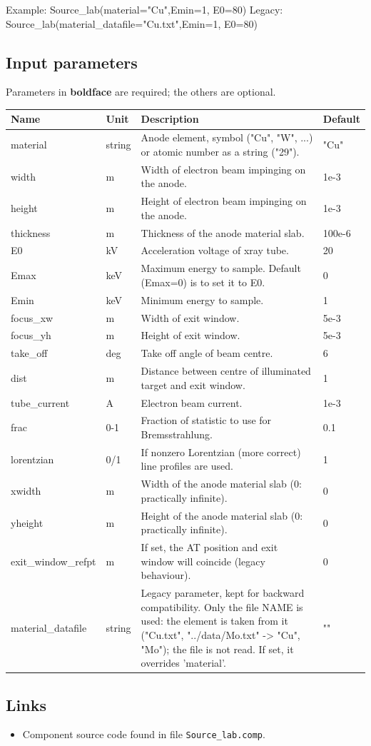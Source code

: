 Example: Source\_lab(material="Cu",Emin=1, E0=80) Legacy: Source\_lab(material\_datafile="Cu.txt",Emin=1, E0=80)

\subsection*{Input parameters}
Parameters in \textbf{boldface} are required; the others are optional.

\begin{longtable}{p{}p{}p{}p{}}
\toprule
\textbf{Name} & \textbf{Unit} & \textbf{Description} & \textbf{Default} \\
\midrule
\endhead
material & string & Anode element, symbol ("Cu", "W", ...) or atomic number as a string ("29"). & "Cu" \\
width & m & Width of electron beam impinging on the anode. & 1e-3 \\
height & m & Height of electron beam impinging on the anode. & 1e-3 \\
thickness & m & Thickness of the anode material slab. & 100e-6 \\
E0 & kV & Acceleration voltage of xray tube. & 20 \\
Emax & keV & Maximum energy to sample. Default (Emax=0) is to set it to E0. & 0 \\
Emin & keV & Minimum energy to sample. & 1 \\
focus\_xw & m & Width of exit window. & 5e-3 \\
focus\_yh & m & Height of exit window. & 5e-3 \\
take\_off & deg & Take off angle of beam centre. & 6 \\
dist & m & Distance between centre of illuminated target and exit window. & 1 \\
tube\_current & A & Electron beam current. & 1e-3 \\
frac & 0-1 & Fraction of statistic to use for Bremsstrahlung. & 0.1 \\
lorentzian & 0/1 & If nonzero Lorentzian (more correct) line profiles are used. & 1 \\
xwidth & m & Width of the anode material slab (0: practically infinite). & 0 \\
yheight & m & Height of the anode material slab (0: practically infinite). & 0 \\
exit\_window\_refpt & m & If set, the AT position and exit window will coincide (legacy behaviour). & 0 \\
material\_datafile & string & Legacy parameter, kept for backward compatibility. Only the file NAME is used: the element is taken from it ("Cu.txt", "../data/Mo.txt" -\textgreater{} "Cu", "Mo"); the file is not read. If set, it overrides 'material'. & "" \\
\bottomrule
\end{longtable}

\subsection*{Links}
\begin{itemize}
  \item Component source code found in file \texttt{Source\_lab.comp}.
\end{itemize}
